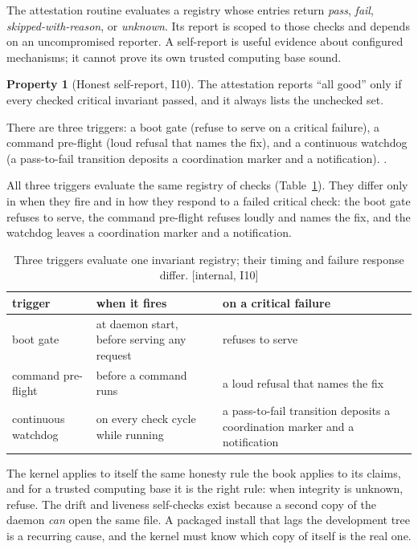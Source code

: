 \documentclass[11pt,a4paper]{article}
\theoremstyle{definition}
\newtheorem{property}{Property}[section]
\theoremstyle{remark}
\begin{document}
The attestation routine evaluates a registry whose entries return
\emph{pass}, \emph{fail}, \emph{skipped-with-reason}, or \emph{unknown}.
Its report is scoped to those checks and depends on an uncompromised reporter.
A self-report is useful evidence about configured mechanisms; it cannot prove
its own trusted computing base sound.

\begin{property}[Honest self-report, I10]\label{prop:attest}
\setlength{\parskip}{4pt plus 1pt}
The attestation reports ``all good'' only if every checked critical invariant
passed, and it always lists the unchecked set.

There are three triggers: a
boot gate (refuse to serve on a critical failure), a command pre-flight
(loud refusal that names the fix), and a continuous watchdog (a pass-to-fail
transition deposits a coordination marker and a notification). \Built.
\end{property}

All three triggers evaluate the same registry of checks
(Table~\ref{tab:swk-attestation-triggers}). They differ only in when they fire
and in how they respond to a failed critical check: the boot gate refuses to
serve, the command pre-flight refuses loudly and names the fix, and the
watchdog leaves a coordination marker and a notification.

\begin{table}[H]
\centering
\caption{Three triggers evaluate one invariant registry; their timing and
failure response differ. [internal, I10]}
\label{tab:swk-attestation-triggers}
\small
\renewcommand{\arraystretch}{1.2}
\begin{tabularx}{\textwidth}{@{}>{\raggedright\arraybackslash}p{} >{\raggedright\arraybackslash}p{} X@{}}
\toprule
\textbf{trigger} & \textbf{when it fires} & \textbf{on a critical failure} \\
\midrule
boot gate & at daemon start, before serving any request & refuses to serve \\
command pre-flight & before a command runs & a loud refusal that names the fix \\
continuous watchdog & on every check cycle while running & a pass-to-fail transition deposits a coordination marker and a notification \\
\bottomrule
\end{tabularx}
\end{table}

The kernel applies to itself the same honesty rule the book applies to its
claims, and for a trusted computing base it is the right rule: when integrity is
unknown, refuse. The drift and liveness self-checks exist because a second copy
of the daemon \emph{can} open the same file. A packaged install that lags the
development tree is a recurring cause, and the kernel must know which copy of
itself is the real one.
\end{document}
